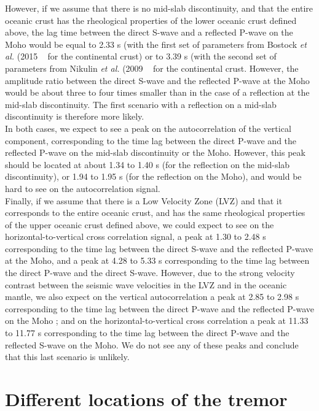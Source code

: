\documentclass[main.tex]{subfiles}
\begin{document}
However, if we assume that there is no mid-slab discontinuity, and that the entire oceanic crust has the rheological properties of the lower oceanic crust defined above, the lag time between the direct S-wave and a reflected P-wave on the Moho would be equal to 2.33 s (with the first set of parameters from Bostock \textit{et al.} (2015 ~\cite{BOS_2015} for the continental crust) or to 3.39 s (with the second set of parameters from Nikulin \textit{et al.} (2009 ~\cite{NIK_2009} for the continental crust. However, the amplitude ratio between the direct S-wave and the reflected P-wave at the Moho would be about three to four times smaller than in the case of a reflection at the mid-slab discontinuity. The first scenario with a reflection on a mid-slab discontinuity is therefore more likely. \\

In both cases, we expect to see a peak on the autocorrelation of the vertical component, corresponding to the time lag between the direct P-wave and the reflected P-wave on the mid-slab discontinuity or the Moho. However, this peak should be located at about 1.34 to 1.40 s (for the reflection on the mid-slab discontinuity), or 1.94 to 1.95 s (for the reflection on the Moho), and would be hard to see on the autocorrelation signal. \\

Finally, if we assume that there is a Low Velocity Zone (LVZ) and that it corresponds to the entire oceanic crust, and has the same rheological properties of the upper oceanic crust defined above, we could expect to see on the horizontal-to-vertical cross correlation signal, a peak at 1.30 to 2.48 s corresponding to the time lag between the direct S-wave and the reflected P-wave at the Moho, and a peak at 4.28 to 5.33 s corresponding to the time lag between the direct P-wave and the direct S-wave. However, due to the strong velocity contrast between the seismic wave velocities in the LVZ and in the oceanic mantle, we also expect on the vertical autocorrelation a peak at 2.85 to 2.98 s corresponding to the time lag between the direct P-wave and the reflected P-wave on the Moho ; and on the horizontal-to-vertical cross correlation a peak at 11.33 to 11.77 s corresponding to the time lag between the direct P-wave and the reflected S-wave on the Moho. We do not see any of these peaks and conclude that this last scenario is unlikely.

\section{Different locations of the tremor}
\end{document}
